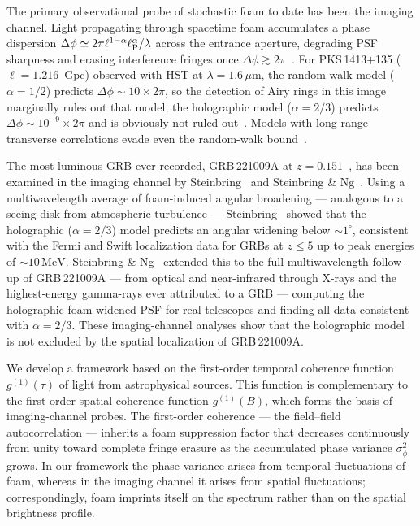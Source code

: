 \documentclass[aps,prd,onecolumn,amsmath,amssymb]{revtex4-2}
\begin{document}
The primary observational probe of stochastic foam to date has been the imaging
channel. Light propagating through spacetime foam accumulates a phase dispersion
$\Delta\phi \simeq 2\pi\ell^{1-\alpha}\ell_{\rm P}^{\alpha}/\lambda$ across the
entrance aperture, degrading PSF sharpness and erasing interference fringes once
$\Delta\phi \gtrsim 2\pi$~\cite{LieuHillman2003}.
For PKS\,1413$+$135 ($\ell = 1.216$~Gpc) observed with HST at $\lambda=1.6\,\mu$m,
the random-walk model ($\alpha=1/2$) predicts $\Delta\phi \sim 10\times 2\pi$,
so the detection of Airy rings in this image marginally rules out that model;
the holographic model ($\alpha=2/3$) predicts $\Delta\phi \sim 10^{-9}\times 2\pi$
and is obviously not ruled out~\cite{NgPerlman2022,Christiansen2011,Perlman2015}.
Models with long-range transverse correlations evade even the random-walk
bound~\cite{LeeZurekChen2024}.

The most luminous GRB ever recorded, GRB\,221009A at $z=0.151$~\cite{Ravasio2024}, has been
examined in the imaging channel by Steinbring~\cite{Steinbring2023} and
Steinbring \& Ng~\cite{SteinbringNg2026}.
Using a multiwavelength average of foam-induced angular broadening ---
analogous to a seeing disk from atmospheric turbulence ---
Steinbring~\cite{Steinbring2023} showed that the holographic ($\alpha=2/3$)
model predicts an angular widening below $\sim\!1^{\circ}$, consistent
with the Fermi and Swift localization data for GRBs at $z\leq 5$ up to
peak energies of $\sim\!10\,\mathrm{MeV}$.
Steinbring \& Ng~\cite{SteinbringNg2026} extended this to the full
multiwavelength follow-up of GRB\,221009A --- from optical and near-infrared
through X-rays and the highest-energy gamma-rays ever attributed to a GRB ---
computing the holographic-foam-widened PSF for real telescopes and finding all
data consistent with $\alpha=2/3$.
These imaging-channel analyses show that the holographic model is not
excluded by the spatial localization of GRB\,221009A.

We develop a framework based on the first-order temporal coherence
function $g^{(1)}(\tau)$ of light from astrophysical sources.
This function is complementary to the first-order spatial coherence
function $g^{(1)}(B)$, which forms the basis of imaging-channel probes.
The first-order coherence --- the field--field autocorrelation ---
inherits a foam suppression factor
that decreases continuously from unity toward complete fringe erasure as
the accumulated phase variance $\sigma_\phi^2$ grows.
In our framework the phase variance arises from temporal fluctuations of
foam, whereas in the imaging channel it arises from spatial fluctuations;
correspondingly, foam imprints itself on the spectrum rather than on the
spatial brightness profile.
\end{document}
